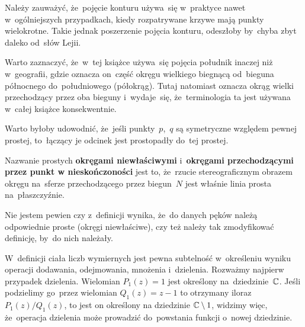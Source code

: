\documentclass[a4paper,11pt]{article}
\begin{document}
Należy zauważyć, że~pojęcie konturu używa~się w~praktyce nawet
w~ogólniejszych przypadkach, kiedy rozpatrywane krzywe mają punkty
wielokrotne. Takie jednak poszerzenie pojęcia konturu, odeszłoby
by~chyba zbyt daleko od~słów Lejii.

\vspace{\spaceFour}





\noindent
{} Warto zaznaczyć, że~w~tej książce używa~się pojęcia
południk inaczej niż w~geografii, gdzie oznacza on~część okręgu
wielkiego biegnącą od~bieguna północnego do~południowego (półokrąg).
Tutaj natomiast oznacza okrąg wielki przechodzący przez oba bieguny
i~wydaje~się, że~terminologia ta jest używana w~całej książce
konsekwentnie.

\vspace{\spaceFour}





\noindent
{} Warto byłoby udowodnić, że~jeśli punkty~$p$,~$q$ są symetryczne
względem pewnej prostej, to~łączący je odcinek jest prostopadły do~tej
prostej.

\vspace{\spaceFour}





\noindent
{} Nazwanie prostych \textbf{okręgami niewłaściwymi}
i~\textbf{okręgami przechodzącymi przez punkt w nieskończoności} jest
to, że~rzucie stereograficznym obrazem okręgu na~sferze przechodzącego
przez biegun~$N$ jest właśnie linia prosta na~płaszczyźnie.

\vspace{\spaceFour}





\noindent
{} Nie jestem pewien czy z~definicji wynika, że~do danych pęków
należą odpowiednie proste (okręgi niewłaściwe), czy też należy tak
zmodyfikować definicję, by~do nich należały.

\vspace{\spaceFour}





\noindent
{} W~definicji ciała liczb wymiernych jest pewna subtelność
w~określeniu wyniku operacji dodawania, odejmowania, mnożenia i~dzielenia.
Rozważmy najpierw przypadek dzielenia. Wielomian $P_{ 1 }( z ) = 1$ jest
określony na~dziedzinie~$\mathbb{C}$. Jeśli podzielimy go~przez wielomian
$Q_{ 1 }( z ) = z - 1$ to otrzymany iloraz $P_{ 1 }( z ) / Q_{ 1 }( z )$,
to jest on określony na dziedzinie $\mathbb{C} \setminus 1$, widzimy więc, że~operacja
dzielenia może prowadzić do~powstania funkcji o~nowej dziedzinie.
\end{document}
